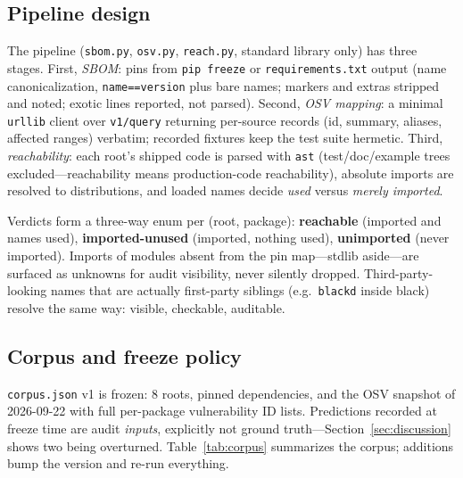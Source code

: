 \documentclass[11pt,a4paper]{article}
\begin{document}
\subsection{Pipeline design}

The pipeline (\verb!sbom.py!, \verb!osv.py!, \verb!reach.py!, standard library only) has three stages. First, \textit{SBOM}: pins from \verb!pip freeze! or \verb!requirements.txt! output (name canonicalization, \verb!name==version! plus bare names; markers and extras stripped and noted; exotic lines reported, not parsed). Second, \textit{OSV mapping}: a minimal \verb!urllib! client over \verb!v1/query! returning per-source records (id, summary, aliases, affected ranges) verbatim; recorded fixtures keep the test suite hermetic. Third, \textit{reachability}: each root's shipped code is parsed with \verb!ast! (test/doc/example trees excluded---reachability means production-code reachability), absolute imports are resolved to distributions, and loaded names decide \textit{used} versus \textit{merely imported}.

Verdicts form a three-way enum per (root, package): \textbf{reachable} (imported and names used), \textbf{imported-unused} (imported, nothing used), \textbf{unimported} (never imported). Imports of modules absent from the pin map---stdlib aside---are surfaced as unknowns for audit visibility, never silently dropped. Third-party-looking names that are actually first-party siblings (e.g.\ \verb!blackd! inside black) resolve the same way: visible, checkable, auditable.

\subsection{Corpus and freeze policy}

\verb!corpus.json! v1 is frozen: 8 roots, pinned dependencies, and the OSV snapshot of 2026-09-22 with full per-package vulnerability ID lists. Predictions recorded at freeze time are audit \textit{inputs}, explicitly not ground truth---Section~\ref{sec:discussion} shows two being overturned. Table~\ref{tab:corpus} summarizes the corpus; additions bump the version and re-run everything.
\end{document}

